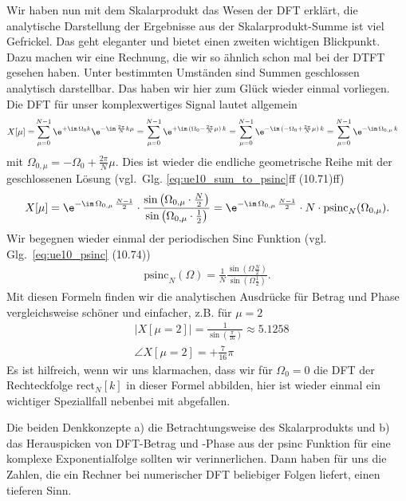 \begin{ExCalc}
Wir haben nun mit dem Skalarprodukt das Wesen der DFT erklärt,
die analytische Darstellung der Ergebnisse aus der Skalarprodukt-Summe
ist viel Gefrickel.
%
Das geht eleganter und bietet einen zweiten wichtigen Blickpunkt. Dazu
machen wir eine Rechnung, die wir so ähnlich schon mal bei der DTFT gesehen haben.
Unter bestimmten Umständen sind Summen geschlossen analytisch darstellbar.
Das haben wir hier zum Glück wieder einmal vorliegen.
Die DFT für unser komplexwertiges Signal lautet allgemein
\begin{align}
X[\mu] =& \sum_{\mu=0}^{N-1} \e^{+\im\,\Omega_0 k} \e^{-\im\,\frac{2\pi}{N} k \mu}
=  \sum_{\mu=0}^{N-1} \e^{+\im\,(\Omega_0 - \frac{2\pi}{N} \mu) \, k}
=  \sum_{\mu=0}^{N-1} \e^{-\im\,(-\Omega_0 + \frac{2\pi}{N} \mu) \, k}
=  \sum_{\mu=0}^{N-1} \e^{-\im\, \Omega_{0,\mu} \,k}
\end{align}
mit $\Omega_{0,\mu} = -\Omega_0 + \frac{2\pi}{N} \mu$.
Dies ist wieder die endliche geometrische Reihe mit der geschlossenen Lösung
(vgl.~Glg. \eqref{eq:ue10_sum_to_psinc}ff (10.71)ff)
\begin{align}
X[\mu] = \e^{-\im \,\Omega_{0,\mu}\,\frac{N-1}{2}} \cdot
\frac{\sin\left(\Omega_{0,\mu}\cdot\frac{N}{2}\right)}{\sin\left(\Omega_{0,\mu}\cdot\frac{1}{2}\right)}
=\e^{-\im \,\Omega_{0,\mu}\,\frac{N-1}{2}} \cdot N \cdot \mathrm{psinc}_N(\Omega_{0,\mu})
.
\end{align}
Wir begegnen wieder einmal der periodischen Sinc Funktion (vgl. Glg.~\eqref{eq:ue10_psinc} (10.74))
\begin{align*}
\mathrm{psinc}_N(\Omega) = \frac{1}{N}\frac{\sin({\Omega\frac{N}{2}})}{\sin({\Omega\frac{1}{2}})}.
\end{align*}
%
Mit diesen Formeln finden wir die analytischen Ausdrücke für Betrag und Phase
vergleichsweise schöner und einfacher, z.B. für $\mu=2$
\begin{align}
&|X[\mu=2]| = \frac{1}{\sin(\frac{\pi}{16})} \approx 5.1258\\
&\angle X[\mu=2] = +\frac{7}{16}\pi
\end{align}
Es ist hilfreich, wenn wir uns klarmachen, dass wir für $\Omega_0=0$ die DFT der
Rechteckfolge $\mathrm{rect}_N[k]$
in dieser Formel abbilden, hier ist wieder einmal ein wichtiger Speziallfall
nebenbei mit abgefallen.

Die beiden Denkkonzepte
a) die Betrachtungsweise des
Skalarprodukts
und
b) das Herauspicken von DFT-Betrag und -Phase aus der psinc Funktion
für eine komplexe Exponentialfolge
sollten wir verinnerlichen. Dann haben für uns die Zahlen,
die ein Rechner bei numerischer DFT beliebiger Folgen liefert, einen tieferen
Sinn.


\end{ExCalc}
